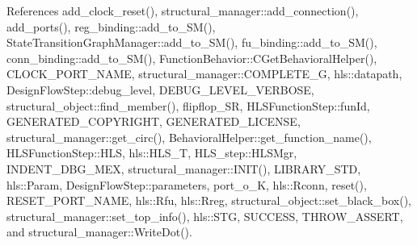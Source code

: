References add\+\_\+clock\+\_\+reset(), structural\+\_\+manager\+::add\+\_\+connection(), add\+\_\+ports(), reg\+\_\+binding\+::add\+\_\+to\+\_\+\+S\+M(), State\+Transition\+Graph\+Manager\+::add\+\_\+to\+\_\+\+S\+M(), fu\+\_\+binding\+::add\+\_\+to\+\_\+\+S\+M(), conn\+\_\+binding\+::add\+\_\+to\+\_\+\+S\+M(), Function\+Behavior\+::\+C\+Get\+Behavioral\+Helper(), C\+L\+O\+C\+K\+\_\+\+P\+O\+R\+T\+\_\+\+N\+A\+ME, structural\+\_\+manager\+::\+C\+O\+M\+P\+L\+E\+T\+E\+\_\+G, hls\+::datapath, Design\+Flow\+Step\+::debug\+\_\+level, D\+E\+B\+U\+G\+\_\+\+L\+E\+V\+E\+L\+\_\+\+V\+E\+R\+B\+O\+SE, structural\+\_\+object\+::find\+\_\+member(), flipflop\+\_\+\+SR, H\+L\+S\+Function\+Step\+::fun\+Id, G\+E\+N\+E\+R\+A\+T\+E\+D\+\_\+\+C\+O\+P\+Y\+R\+I\+G\+HT, G\+E\+N\+E\+R\+A\+T\+E\+D\+\_\+\+L\+I\+C\+E\+N\+SE, structural\+\_\+manager\+::get\+\_\+circ(), Behavioral\+Helper\+::get\+\_\+function\+\_\+name(), H\+L\+S\+Function\+Step\+::\+H\+LS, hls\+::\+H\+L\+S\+\_\+T, H\+L\+S\+\_\+step\+::\+H\+L\+S\+Mgr, I\+N\+D\+E\+N\+T\+\_\+\+D\+B\+G\+\_\+\+M\+EX, structural\+\_\+manager\+::\+I\+N\+I\+T(), L\+I\+B\+R\+A\+R\+Y\+\_\+\+S\+TD, hls\+::\+Param, Design\+Flow\+Step\+::parameters, port\+\_\+o\+\_\+K, hls\+::\+Rconn, reset(), R\+E\+S\+E\+T\+\_\+\+P\+O\+R\+T\+\_\+\+N\+A\+ME, hls\+::\+Rfu, hls\+::\+Rreg, structural\+\_\+object\+::set\+\_\+black\+\_\+box(), structural\+\_\+manager\+::set\+\_\+top\+\_\+info(), hls\+::\+S\+TG, S\+U\+C\+C\+E\+SS, T\+H\+R\+O\+W\+\_\+\+A\+S\+S\+E\+RT, and structural\+\_\+manager\+::\+Write\+Dot().

